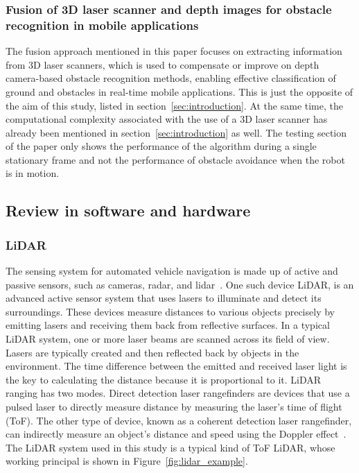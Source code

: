\subsubsection[Fusion of 3D laser scanner and depth images for obstacle recognition in mobile applications]{Fusion of 3D laser scanner and depth images for obstacle recognition in mobile applications~\cite{literature5}}
The fusion approach mentioned in this paper focuses on extracting information from 3D laser scanners, 
which is used to compensate or improve on depth camera-based obstacle recognition methods, 
enabling effective classification of ground and obstacles in real-time mobile applications. 
This is just the opposite of the aim of this study, listed in section~\ref{sec:introduction}. 
At the same time, the computational complexity associated with the use of a 3D laser scanner has already been mentioned in section~\ref{sec:introduction} as well. 
The testing section of the paper only shows the performance of the algorithm during a single stationary frame and not the performance of obstacle avoidance when the robot is in motion.
\subsection{Review in software and hardware}
\subsubsection{LiDAR}
\label{subsec:lidar}
The sensing system for automated vehicle navigation is made up of active and passive sensors, such as cameras, radar, and lidar~\cite{lidar}.
One such device LiDAR, is an advanced active sensor system that uses lasers to illuminate 
and detect its surroundings. These devices measure distances to various objects precisely 
by emitting lasers and receiving them back from reflective surfaces. 
In a typical LiDAR system, one or more laser beams are scanned across its field of view. 
Lasers are typically created and then reflected back by objects in the environment. The time difference between the emitted and received laser light is the key to calculating the distance because it is proportional to it. 
LiDAR ranging has two modes.
Direct detection laser rangefinders are devices that use a pulsed laser 
to directly measure distance by measuring the laser's time of flight (ToF). 
The other type of device, known as a coherent detection laser rangefinder, 
can indirectly measure an object's distance and speed using the Doppler effect~\cite{lidarintro}. 
The LiDAR system used in this study is a typical kind of ToF LiDAR, whose working principal is shown in Figure~\ref{fig:lidar_example}.

